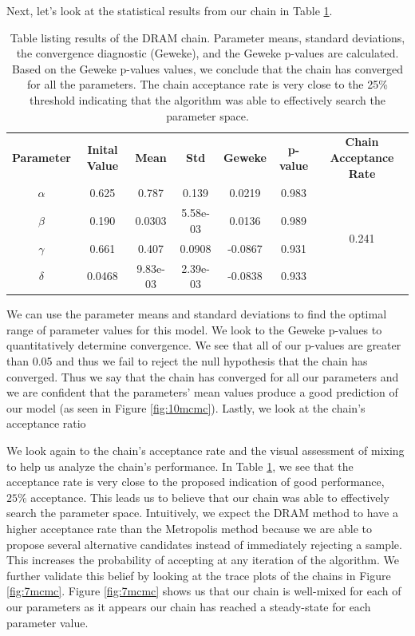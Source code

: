 \par Next, let's look at the statistical results from our chain in Table \ref{tab:2mcmc}.
%           
\begin{table}[H]
\centering
        \begin{tabular}{c c |c c | c c ||c}
            \hline
            \textbf{Parameter} & \textbf{Inital Value} & \textbf{Mean} &  \textbf{Std} & \textbf{Geweke} & \textbf{p-value} & \textbf{Chain Acceptance Rate}\\ 
            \cline{1-7}
            $\alpha$ & 0.625 & 0.787 & 0.139 & 0.0219 & 0.983 & \multirow{4}{*}{0.241} \\
            $\beta$ & 0.190 & 0.0303 & 5.58e-03 & 0.0136 & 0.989\\
            $\gamma$ & 0.661 & 0.407 & 0.0908 & -0.0867 & 0.931\\
            $\delta$ & 0.0468 & 9.83e-03 & 2.39e-03 & -0.0838 & 0.933
             \\\hline
                          \hline
                           
        \end{tabular}
    \caption{Table listing results of the DRAM chain. Parameter means, standard deviations, the convergence diagnostic (Geweke), and the Geweke p-values are calculated. Based on the Geweke p-values values, we conclude that the chain has converged for all the parameters. The chain acceptance rate is very close to the 25\% threshold indicating that the algorithm was able to effectively search the parameter space.}
    \label{tab:2mcmc}
\end{table}
We can use the parameter means and standard deviations to find the optimal range of parameter values for this model. We look to the Geweke p-values to quantitatively determine convergence. We see that all of our p-values are greater than 0.05 and thus we fail to reject the null hypothesis that the chain has converged.
Thus we say that the chain has converged for all our parameters and we are confident that the parameters' mean values produce a good prediction of our model (as seen in Figure \ref{fig:10mcmc}). Lastly, we look at the chain's acceptance ratio 
\par We look again to the chain's acceptance rate and the visual assessment of mixing to help us analyze the chain's performance. In Table \ref{tab:2mcmc}, we see that the acceptance rate is very close to the proposed indication of good performance, $25\%$ acceptance. This leads us to believe that our chain was able to effectively search the parameter space. Intuitively, we expect the DRAM method to have a higher acceptance rate than the Metropolis method because we are able to propose several alternative candidates instead of immediately rejecting a sample. This increases the probability of accepting at any iteration of the algorithm. We further validate this belief by looking at the trace plots of the chains in Figure \ref{fig:7mcmc}. Figure \ref{fig:7mcmc} shows us that our chain is well-mixed for each of our parameters as it appears our chain has reached a steady-state for each parameter value. 
